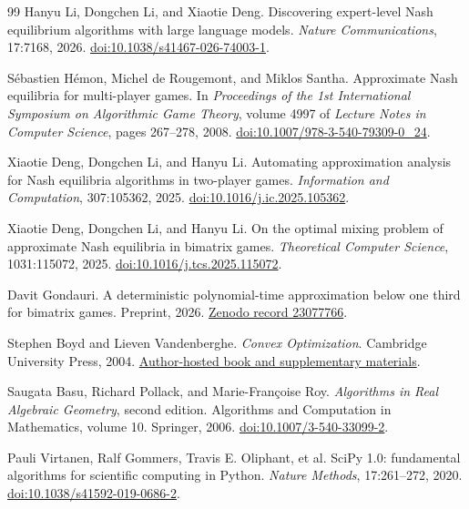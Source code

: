 \documentclass[11pt]{article}
\theoremstyle{remark}
\theoremstyle{plain}
\begin{document}
\begin{thebibliography}{99}
Hanyu Li, Dongchen Li, and Xiaotie Deng.
\newblock Discovering expert-level Nash equilibrium algorithms with large
language models.
\newblock \emph{Nature Communications}, 17:7168, 2026.
\newblock \href{https://doi.org/10.1038/s41467-026-74003-1}{doi:10.1038/s41467-026-74003-1}.

S{\'e}bastien H{\'e}mon, Michel de Rougemont, and Miklos Santha.
\newblock Approximate Nash equilibria for multi-player games.
\newblock In \emph{Proceedings of the 1st International Symposium on
Algorithmic Game Theory}, volume 4997 of \emph{Lecture Notes in Computer
Science}, pages 267--278, 2008.
\newblock \href{https://doi.org/10.1007/978-3-540-79309-0_24}{doi:10.1007/978-3-540-79309-0\_24}.

Xiaotie Deng, Dongchen Li, and Hanyu Li.
\newblock Automating approximation analysis for Nash equilibria algorithms in
two-player games.
\newblock \emph{Information and Computation}, 307:105362, 2025.
\newblock \href{https://doi.org/10.1016/j.ic.2025.105362}{doi:10.1016/j.ic.2025.105362}.

Xiaotie Deng, Dongchen Li, and Hanyu Li.
\newblock On the optimal mixing problem of approximate Nash equilibria in
bimatrix games.
\newblock \emph{Theoretical Computer Science}, 1031:115072, 2025.
\newblock \href{https://doi.org/10.1016/j.tcs.2025.115072}{doi:10.1016/j.tcs.2025.115072}.

Davit Gondauri.
\newblock A deterministic polynomial-time approximation below one third for
bimatrix games.
\newblock Preprint, 2026.
\newblock \href{https://zenodo.org/records/23077766}{Zenodo record 23077766}.

Stephen Boyd and Lieven Vandenberghe.
\newblock \emph{Convex Optimization}.
\newblock Cambridge University Press, 2004.
\newblock \href{https://web.stanford.edu/~boyd/cvxbook/}{Author-hosted book and supplementary materials}.

Saugata Basu, Richard Pollack, and Marie-Fran\c{c}oise Roy.
\newblock \emph{Algorithms in Real Algebraic Geometry}, second edition.
\newblock Algorithms and Computation in Mathematics, volume 10.
Springer, 2006.
\newblock \href{https://doi.org/10.1007/3-540-33099-2}{doi:10.1007/3-540-33099-2}.

Pauli Virtanen, Ralf Gommers, Travis E. Oliphant, et al.
\newblock SciPy 1.0: fundamental algorithms for scientific computing in Python.
\newblock \emph{Nature Methods}, 17:261--272, 2020.
\newblock \href{https://doi.org/10.1038/s41592-019-0686-2}{doi:10.1038/s41592-019-0686-2}.


\end{thebibliography}
\end{document}
